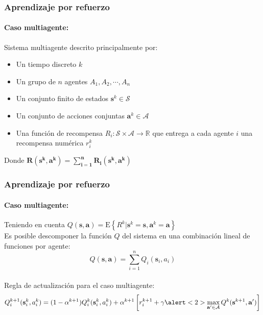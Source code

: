 \documentclass[11pt]{beamer}
\begin{document}
\begin{frame}
\frametitle{Aprendizaje por refuerzo}
\framesubtitle{Caso multiagente:}
Sistema multiagente descrito principalmente por:\\
\begin{itemize}
\item Un tiempo discreto $k$
\item Un grupo de $n$ agentes ${A_1, A_2, \cdots, A_n}$
\item Un conjunto finito de estados $\mathbf{s}^k \in \mathcal{S}$
\item Un conjunto de acciones conjuntas $\mathbf{a}^k\in \mathcal{A}$
\item Una función de recompensa $R_i:\mathcal{S} \times \mathcal{A}\rightarrow \mathbb{R}$ que entrega a cada agente $i$ una recompensa numérica $r_i^k$\\
\end{itemize}
\bigskip
\begin{center}
Donde $\mathbf{R(s^k,a^k)=\sum_{i=1}^{n} R_i(s^k,a^k)}$
\end{center}
\end{frame}

\begin{frame}
\frametitle{Aprendizaje por refuerzo}
\framesubtitle{Caso multiagente:}
Teniendo en cuenta $Q(\mathbf{s},\mathbf{a})=\mathrm{E}\left\lbrace R^k | \mathbf{s}^k=\mathbf{s}, \mathbf{a}^k=\mathbf{a} \right\rbrace $\\
\bigskip
Es posible descomponer la función $Q$ del sistema en una combinación lineal de funciones por agente:
$$Q(\mathbf{s},\mathbf{a})=\sum_{i=1}^{n}Q_i(\mathbf{s}_i,a_i)$$\\
Regla de actualización para el caso multiagente:
$$Q_i^{k+1}(\mathbf{s}_i^k,a_i^k)=(1-\alpha^{k+1})Q_i^k(\mathbf{s}_i^k,a_i^k)+\alpha^{k+1} \left[r_i^{k+1} + \gamma \alert<2>{\max_{\mathbf{a}^\prime \in \mathcal{A}}Q^k(\mathbf{s}^{k+1},\mathbf{a}^\prime)} \right]$$
\pause
\end{frame}
\end{document}
